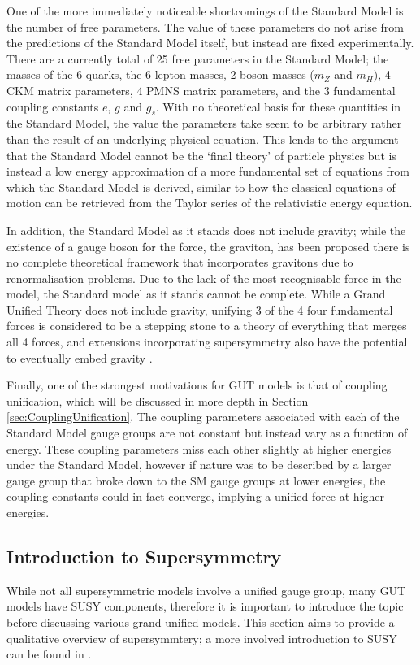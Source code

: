 \documentclass{article}
\begin{document}
One of the more immediately noticeable shortcomings of the Standard Model is the number of free parameters. The value of these parameters do not arise from the predictions of the Standard Model itself, but instead are fixed experimentally. There are a currently total of 25 free parameters in the Standard Model; the masses of the 6 quarks, the 6 lepton masses, 2 boson masses ($m_Z$ and $m_H$), 4 CKM matrix parameters, 4 PMNS matrix parameters, and the 3 fundamental coupling constants $e$, $g$ and $g_s$. With no theoretical basis for these quantities in the Standard Model, the value the parameters take seem to be arbitrary rather than the result of an underlying physical equation. This lends to the argument that the Standard Model cannot be the `final theory' of particle physics but is instead a low energy approximation of a more fundamental set of equations from which the Standard Model is derived, similar to how the classical equations of motion can be retrieved from the Taylor series of the relativistic energy equation.

In addition, the Standard Model as it stands does not include gravity; while the existence of a gauge boson for the force, the graviton, has been proposed there is no complete theoretical framework that incorporates gravitons due to renormalisation problems. Due to the lack of the most recognisable force in the model, the Standard model as it stands cannot be complete. While a Grand Unified Theory does not include gravity, unifying 3 of the 4 four fundamental forces is considered to be a stepping stone to a theory of everything that merges all 4 forces, and extensions incorporating supersymmetry also have the potential to eventually embed gravity \cite{SUSYGravity}.

Finally, one of the strongest motivations for GUT models is that of coupling unification, which will be discussed in more depth in Section \ref{sec:CouplingUnification}. The coupling parameters associated with each of the Standard Model gauge groups are not constant but instead vary as a function of energy. These coupling parameters miss each other slightly at higher energies under the Standard Model, however if nature was to be described by a larger gauge group that broke down to the SM gauge groups at lower energies, the coupling constants could in fact converge, implying a unified force at higher energies. 

\subsection{Introduction to Supersymmetry}%
\label{sec:GUT_SUSYIntro}
While not all supersymmetric models involve a unified gauge group, many GUT models have SUSY components, therefore it is important to introduce the topic before discussing various grand unified models. This section aims to provide a qualitative overview of supersymmtery; a more involved introduction to SUSY can be found in \cite{SUSYPrimer}.
\end{document}
